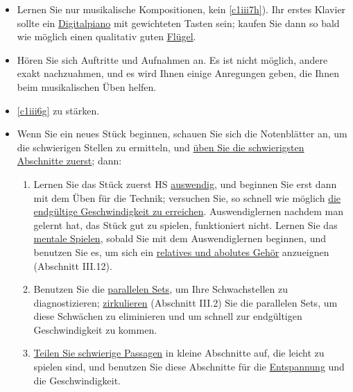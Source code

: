 \begin{itemize} 
\item Lernen Sie nur musikalische Kompositionen, kein \hyperref[c1iii7h]{\autoref{c1iii7h}}).
Ihr erstes Klavier sollte ein \hyperref[c1iii17b]{Digitalpiano} mit gewichteten Tasten sein; kaufen Sie dann so bald wie möglich einen qualitativ guten \hyperref[c1iii17d]{Flügel}.

\item Hören Sie sich Auftritte und Aufnahmen an.
Es ist nicht möglich, andere exakt nachzuahmen, und es wird Ihnen einige Anregungen geben, die Ihnen beim musikalischen Üben helfen.

\item \hyperref[c1iii6g]{\autoref{c1iii6g}} zu stärken.

\item Wenn Sie ein neues Stück beginnen, schauen Sie sich die Notenblätter an, um die schwierigen Stellen zu ermitteln, und \hyperref[c1ii5]{üben Sie die schwierigsten Abschnitte zuerst}; dann:

 \begin{enumerate}[label={\alph*.}] 
 <li>Üben Sie \hyperref[c1ii7]{mit getrennten Händen} und mit sich überschneidenden Abschnitten (\hyperref[c1ii8]{Kontinuitätsregel}, Abschnitt II.8); wechseln Sie oft die Hände, wenn notwendig, alle fünf Sekunden.
Die gesamte technische Entwicklung sollte HS erfolgen.
 
 \item Lernen Sie das Stück zuerst HS \hyperref[c1iii6]{auswendig}, und beginnen Sie erst dann mit dem Üben für die Technik; versuchen Sie, so schnell wie möglich \hyperref[c1iii7i]{die endgültige Geschwindigkeit zu erreichen}.
Auswendiglernen nachdem man gelernt hat, das Stück gut zu spielen, funktioniert nicht.
Lernen Sie das \hyperref[c1ii12mental]{mentale Spielen}, sobald Sie mit dem Auswendiglernen beginnen, und benutzen Sie es, um sich ein \hyperref[c1iii12]{relatives und abolutes Gehör} anzueignen (Abschnitt III.12).
 
 \item Benutzen Sie die \hyperref[c1ii11]{parallelen Sets}, um Ihre Schwachstellen zu diagnostizieren; \hyperref[c1iii2]{zirkulieren} (Abschnitt III.2) Sie die parallelen Sets, um diese Schwächen zu eliminieren und um schnell zur endgültigen Geschwindigkeit zu kommen.
 
 \item \hyperref[c1ii6]{Teilen Sie schwierige Passagen} in kleine Abschnitte auf, die leicht zu spielen sind, und benutzen Sie diese Abschnitte für die \hyperref[c1ii14]{Entspannung} und die Geschwindigkeit.
 

\end{enumerate}
\end{itemize}

